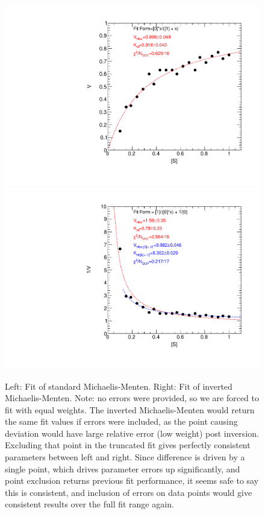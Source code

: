 \documentclass{article}
\begin{document}
\begin{figure}[H]
    \centering
    \includegraphics[width=.49\textwidth]{data1Fit_c.pdf} 
    \includegraphics[width=.49\textwidth]{data2Fit_c.pdf}
    \caption{Left: Fit of standard Michaelis-Menten. Right: Fit of inverted Michaelis-Menten. Note: no errors were provided, so we are forced to fit with equal weights. The inverted Michaelis-Menten would return the same fit values if errors were included, as the point causing deviation would have large relative error (low weight) post inversion. Excluding that point in the truncated fit gives perfectly consistent parameters between left and right. Since difference is driven by a single point, which drives parameter errors up significantly, and point exclusion returns previous fit performance, it seems safe to say this is consistent, and inclusion of errors on data points would give consistent results over the full fit range again.}
    \label{}
\end{figure}
\end{document}
